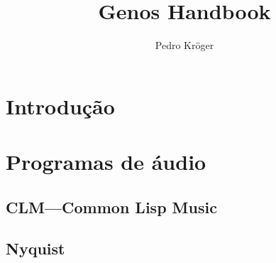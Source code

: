 \documentclass[brazil]{book}
\title{Genos Handbook}
\author{Pedro Kröger}
\begin{document}
\maketitle
\tableofcontents

\part{Introdução}
\label{part:introducao}

\part{Programas de áudio}
\label{part:programas-de-audio}

\chapter{CLM---Common Lisp Music}
\label{cha:clm-common-lisp}

\chapter{Nyquist}
\label{cha:nyquist}
\end{document}
